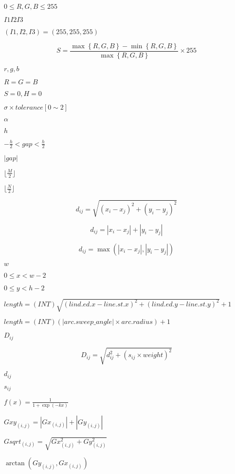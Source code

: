 \documentclass{article}
\begin{document}
$ 0 \le R,G,B \le 255 $
\pagebreak

$ I1I2I3 $
\pagebreak

$\left(I1,I2,I3\right)=\left(255,255,255\right)$
\pagebreak

\[ S=\frac{\max \left\{ R, G, B \right\} - \min \left\{ R, G, B \right\}}{\max \left\{ R, G, B \right\}} \times 255 \]
\pagebreak

$ r, g, b $
\pagebreak

$R=G=B$
\pagebreak

$S=0,H=0$
\pagebreak

$\sigma\times tolerance[0 \sim 2]$
\pagebreak

$ \alpha $
\pagebreak

$h$
\pagebreak

$-\frac{h}{2}<gap<\frac{h}{2}$
\pagebreak

$ |gap| $
\pagebreak

$ \lfloor \frac{M}{2} \rfloor$
\pagebreak

$ \lfloor \frac{N}{2} \rfloor$
\pagebreak

\[ d_{ij} = \sqrt{\left( x_{i} - x_{j} \right)^2+\left( y_{i} - y_{j} \right)^2} \]
\pagebreak

\[ d_{ij} = | x_{i} - x_{j} | + | y_{i} - y_{j} | \]
\pagebreak

\[ d_{ij} = \max \left(| x_{i} - x_{j} | , | y_{i} - y_{j} | \right) \]
\pagebreak

$w$
\pagebreak

$ 0 \leq x < w-2 $
\pagebreak

$ 0 \leq y < h-2 $
\pagebreak

$ length = \left(INT\right)\sqrt{\left(lind.ed.x - line.st.x\right)^2 + \left(lind.ed.y - line.st.y\right)^2} + 1 $
\pagebreak

$ length = \left(INT\right) \left( | arc.sweep\_angle | \times arc.radius \right) + 1 $
\pagebreak

$D_{ij}$
\pagebreak

\[ D_{ij} = \sqrt{ d_{ij}^{2} + \left( s_{ij} \times weight \right)^{2} } \]
\pagebreak

$d_{ij}$
\pagebreak

$s_{ij}$
\pagebreak

$ f(x) = \frac{1}{1 + \exp(-kx)} $
\pagebreak

$Gxy_{(i,j)} = |Gx_{(i,j)}|+|Gy_{(i,j)}|$
\pagebreak

$Gsqrt_{(i,j)} = \sqrt{Gx_{(i,j)}^2+Gy_{(i,j)}^2}$
\pagebreak

$\arctan{ \left( Gy_{(i,j)} , Gx_{(i,j)} \right)}$
\pagebreak
\end{document}
